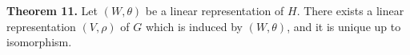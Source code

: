 \textbf{Theorem 11.} Let $(W, \theta)$ be a linear representation of $H$. There exists a linear representation $(V, \rho)$ of $G$ which is induced by $(W, \theta)$, and it is unique up to isomorphism.
